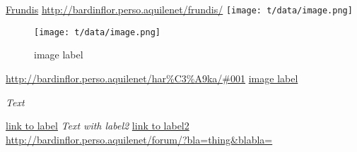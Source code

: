 \href{http://bardinflor.perso.aquilenet/frundis/}{Frundis}
\url{http://bardinflor.perso.aquilenet/frundis/}
\texttt{[image: t/data/image.png]}

\begin{center}
\begin{figure}[htbp]
\texttt{[image: t/data/image.png]}
\caption{image label}
\label{fig:1}
\end{figure}
\end{center}
\url{http://bardinflor.perso.aquilenet/har\%C3\%A9ka/#001}
\hyperref[fig:1]{image label}

\hypertarget{label1}{\emph{Text}}
\hyperlink{label1}{link to label}
\hypertarget{label2}{\emph{Text with label2}}
\hyperlink{label2}{link to label2}
\url{http://bardinflor.perso.aquilenet/forum/?bla=thing&blabla=}

